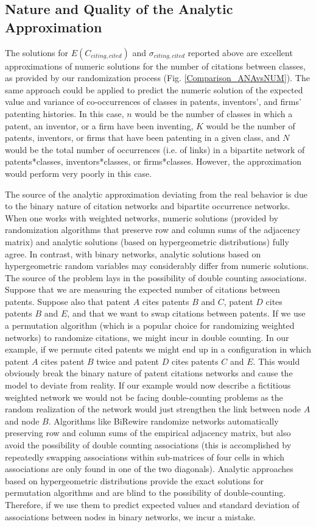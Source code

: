 \documentclass[]{svjour3}
\begin{document}
\subsection{Nature and Quality of the Analytic Approximation}
The solutions for $E(C_{citing,cited})$ and $\sigma_{citing,cited}$ reported above are excellent approximations of numeric solutions  for the number of citations between classes, as provided by our randomization process (Fig. \ref{Comparison_ANAvsNUM}). The same approach could be applied to predict the numeric solution of the expected value and variance of co-occurrences of classes in patents, inventors', and firms' patenting histories. In this case, $n$ would be the number of classes in which a patent, an inventor, or a firm have been inventing, $K$ would be the number of patents, inventors, or firms that have been patenting in a given class, and $N$ would be the total number of occurrences (i.e. of links) in a bipartite network of patents*classes, inventors*classes, or firms*classes. However, the approximation would perform very poorly in this case. 

The source of the analytic approximation deviating from the real behavior is due to the binary nature of citation networks and bipartite occurrence networks. When one works with weighted networks, numeric solutions (provided by randomization algorithms that preserve row and column sums of the adjacency matrix) and analytic solutions (based on hypergeometric distributions) fully agree. In contrast, with binary networks, analytic solutions based on hypergeometric random variables may considerably differ from numeric solutions. The source of the problem lays in the possibility of double counting associations. Suppose that we are measuring the expected number of citations between patents. Suppose also that patent $A$ cites patents $B$ and $C$, patent $D$ cites patents $B$ and $E$, and that we want to swap citations between patents. If we use a permutation algorithm (which is a popular choice for randomizing weighted networks) to randomize citations, we might incur in double counting. In our example, if we permute cited patents we might end up in a configuration in which patent $A$ cites patent $B$ twice and patent $D$ cites patents $C$ and $E$. This would obviously break the binary nature of patent citations networks and cause the model to deviate from reality. If our example would now describe a fictitious weighted network we would not be facing double-counting problems as the random realization of the network would just strengthen the link between node $A$ and node $B$. Algorithms like BiRewire randomize networks automatically preserving row and column sums of the empirical adjacency matrix, but also avoid the possibility of double counting associations (this is accomplished by repeatedly swapping associations within sub-matrices of four cells in which associations are only found in one of the two diagonals). Analytic approaches based on hypergeometric distributions provide the exact solutions for permutation algorithms and are blind to the possibility of double-counting. Therefore, if we use them to predict expected values and standard deviation of associations between nodes in binary networks, we incur a mistake.
\end{document}
